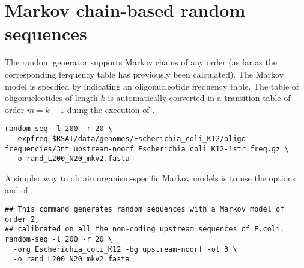\section{Markov chain-based random sequences}

The random generator  supports Markov chains of
any order (as far as the corresponding ferquency table has previously
been calculated). The Markov model is specified by indicating an
oligonucleotide frequency table. The table of oligonucleotides of
length $k$ is automatically converted in a transition table of order
$m=k-1$ duing the execution of . 


\begin{small}
\begin{verbatim}
random-seq -l 200 -r 20 \
  -expfreq $RSAT/data/genomes/Escherichia_coli_K12/oligo-frequencies/3nt_upstream-noorf_Escherichia_coli_K12-1str.freq.gz \
  -o rand_L200_N20_mkv2.fasta 
\end{verbatim}
\end{small}

A simpler way to obtain organism-specific Markov models is to use the
options  and  of . 

\begin{small}
\begin{verbatim}
## This command generates random sequences with a Markov model of order 2,
## calibrated on all the non-coding upstream sequences of E.coli.
random-seq -l 200 -r 20 \
  -org Escherichia_coli_K12 -bg upstream-noorf -ol 3 \
  -o rand_L200_N20_mkv2.fasta 
\end{verbatim}
\end{small}



